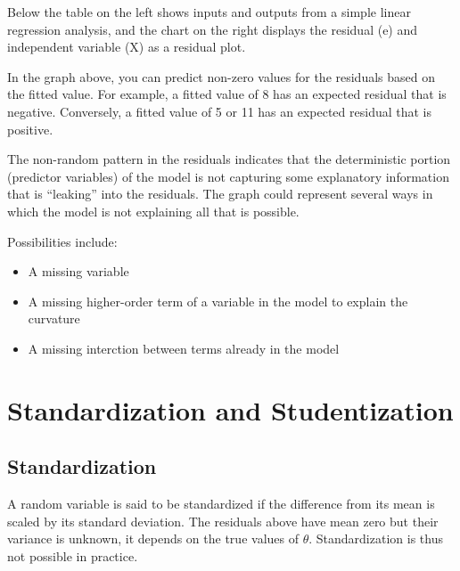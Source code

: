 Below the table on the left shows inputs and outputs from a simple linear regression analysis, and the chart on the right displays the residual (e) and independent variable (X) as a residual plot.

\newpage

\newpage
In the graph above, you can predict non-zero values for the residuals based on the fitted value. For example, a fitted value of 8 has an expected residual that is negative. Conversely, a fitted value of 5 or 11 has an expected residual that is positive.

The non-random pattern in the residuals indicates that the deterministic portion (predictor variables) of the model is not capturing some explanatory information that is “leaking” into the residuals. The graph could represent several ways in which the model is not explaining all that is possible. 

Possibilities include:

\begin{itemize}
\item A missing variable
\item A missing higher-order term of a variable in the model to explain the curvature
\item A missing interction between terms already in the model
\end{itemize}


\newpage
\section{Standardization and Studentization}
\subsection{Standardization} %

A random variable is said to be standardized if the difference from its mean is scaled by its standard deviation. The residuals above have mean zero but their variance is unknown, it depends on the true values of $\theta$. Standardization is thus not possible in practice.

